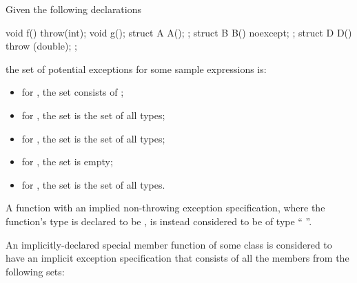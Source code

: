\begin{example}
Given the following declarations
\begin{codeblock}
  void f() throw(int); 
  void g();  
  struct A { A(); };
  struct B { B() noexcept; };
  struct D { D() throw (double); };
\end{codeblock}
the set of potential exceptions for some sample expressions is:
\begin{itemize}
\item
for , the set consists of ;
\item
for , the set is the set of all types;
\item
for , the set is the set of all types;
\item
for , the set is empty;
\item
for , the set is the set of all types.
\end{itemize}
\end{example}

\pnum
A function with an implied non-throwing exception specification,
where the function's type is declared to be ,
is instead considered to be of type `` ''.

\pnum
An implicitly-declared special member function  of some class 
is considered to have an implicit exception specification that
consists of all the members from the following sets:

